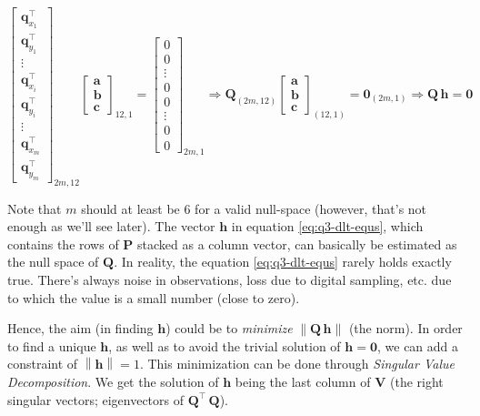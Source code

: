 \begin{equation}
    \begin{bmatrix}
        \mathbf{q}_{x_1}^\top \\
        \mathbf{q}_{y_1}^\top \\
        \vdots \\
        \mathbf{q}_{x_i}^\top \\
        \mathbf{q}_{y_i}^\top \\
        \vdots \\
        \mathbf{q}_{x_m}^\top \\
        \mathbf{q}_{y_m}^\top
        \end{bmatrix}_{2m, 12} \begin{bmatrix}
        \mathbf{a} \\ \mathbf{b} \\ \mathbf{c}
        \end{bmatrix}_{12, 1} = \begin{bmatrix}
        0 \\ 0 \\
        \vdots \\
        0 \\ 0 \\
        \vdots \\
        0 \\ 0
        \end{bmatrix}_{2m, 1}
    \Rightarrow \mathbf{Q}_{(2m, 12)} \begin{bmatrix}
        \mathbf{a} \\ \mathbf{b} \\ \mathbf{c}
        \end{bmatrix}_{(12, 1)} = \mathbf{0}_{(2m, 1)}
    \Rightarrow \mathbf{Q} \, \mathbf{h} = \mathbf{0}
    \label{eq:q3-dlt-equs}
\end{equation}

Note that $m$ should at least be $6$ for a valid null-space (however, that's not enough as we'll see later). The vector $\mathbf{h}$ in equation \ref{eq:q3-dlt-equs}, which contains the rows of $\mathbf{P}$ stacked as a column vector, can basically be estimated as the null space of $\mathbf{Q}$. In reality, the equation \ref{eq:q3-dlt-equs} rarely holds exactly true. There's always noise in observations, loss due to digital sampling, etc. due to which the value is a small number (close to zero).

Hence, the aim (in finding $\mathbf{h}$) could be to \textit{minimize} $\left \| \mathbf{Q \, h} \right \|$ (the norm). In order to find a unique $\mathbf{h}$, as well as to avoid the trivial solution of $\mathbf{h} = \mathbf{0}$, we can add a constraint of $\left \| \mathbf{h} \right \| = 1$. This minimization can be done through \textit{Singular Value Decomposition}. We get the solution of $\mathbf{h}$ being the last column of $\mathbf{V}$ (the right singular vectors; eigenvectors of $\mathbf{Q^\top \, Q}$).

